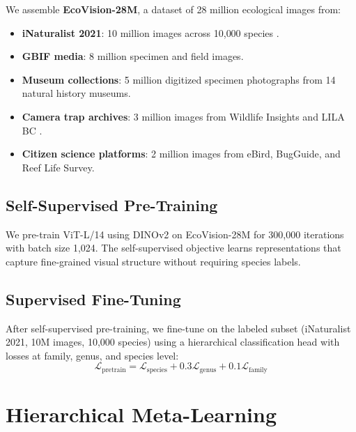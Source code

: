 \documentclass[11pt,a4paper]{article}
\newcommand{\Loss}{\mathcal{L}}
\begin{document}
We assemble \textbf{EcoVision-28M}, a dataset of 28 million ecological
images from:

\begin{itemize}
  \item \textbf{iNaturalist 2021}: 10 million images across 10{,}000
    species \citep{van2021benchmarking}.
  \item \textbf{GBIF media}: 8 million specimen and field images.
  \item \textbf{Museum collections}: 5 million digitized specimen
    photographs from 14 natural history museums.
  \item \textbf{Camera trap archives}: 3 million images from Wildlife
    Insights and LILA BC \citep{beery2021iwildcam}.
  \item \textbf{Citizen science platforms}: 2 million images from
    eBird, BugGuide, and Reef Life Survey.
\end{itemize}

\subsection{Self-Supervised Pre-Training}

We pre-train ViT-L/14 using DINOv2 \citep{oquab2024dinov2} on
EcoVision-28M for 300{,}000 iterations with batch size 1{,}024. The
self-supervised objective learns representations that capture
fine-grained visual structure without requiring species labels.

\subsection{Supervised Fine-Tuning}

After self-supervised pre-training, we fine-tune on the labeled subset
(iNaturalist 2021, 10M images, 10{,}000 species) using a hierarchical
classification head with losses at family, genus, and species level:
\begin{equation}
  \Loss_{\text{pretrain}} = \Loss_{\text{species}} + 0.3
  \Loss_{\text{genus}} + 0.1 \Loss_{\text{family}}
\end{equation}


\section{Hierarchical Meta-Learning}
\label{sec:metalearning}
\end{document}

